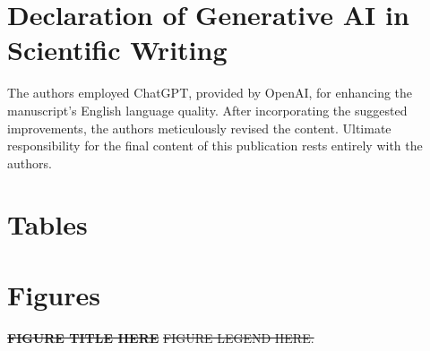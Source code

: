 \documentclass[preprint,review,12pt]{elsarticle}%
\providecommand{\DIFdeltex}[1]{{\protect\color{red}\sout{#1}}}                      %
\providecommand{\DIFdelbegin}{} %
\providecommand{\DIFdelFL}[1]{\DIFdel{#1}} %
\providecommand{\DIFdel}[1]{\texorpdfstring{\DIFdeltex{#1}}{}} %
\newcommand{\DIFscaledelfig}{0.5}
\newlength{\DIFdelgraphicswidth} %
\newlength{\DIFdelgraphicsheight} %
\newcommand{\DIFdelincludegraphics}[2][]{%
\sbox{\DIFdelgraphicsbox}{\DIFOincludegraphics[#1]{#2}}%
\settoboxwidth{\DIFdelgraphicswidth}{\DIFdelgraphicsbox} %
\settoboxtotalheight{\DIFdelgraphicsheight}{\DIFdelgraphicsbox} %
\scalebox{\DIFscaledelfig}{%
\parbox[b]{\DIFdelgraphicswidth}{\usebox{\DIFdelgraphicsbox}\\[-\baselineskip] \rule{\DIFdelgraphicswidth}{0em}}\llap{\resizebox{\DIFdelgraphicswidth}{\DIFdelgraphicsheight}{%
\setlength{\unitlength}{\DIFdelgraphicswidth}%
\begin{picture}(1,1)%
\thicklines\linethickness{2pt} %
{\color[rgb]{1,0,0}\put(0,0){\framebox(1,1){}}}%
{\color[rgb]{1,0,0}\put(0,0){\line( 1,1){1}}}%
{\color[rgb]{1,0,0}\put(0,1){\line(1,-1){1}}}%
\end{picture}%
}\hspace*{3pt}}} %
} %
\DeclareRobustCommand{\DIFdelbegin}{\DIFOdelbegin \let\includegraphics\DIFdelincludegraphics} %
\begin{document}
\begin{frontmatter}
\section*{Declaration of Generative AI in Scientific Writing}
The authors employed ChatGPT, provided by OpenAI, for enhancing the manuscript's English language quality. After incorporating the suggested improvements, the authors meticulously revised the content. Ultimate responsibility for the final content of this publication rests entirely with the authors.
\label{declaration of generative ai in scientific writing}


\clearpage
\section*{Tables}
\label{tables}


\clearpage
\section*{Figures}
\label{figures}

\DIFdelbegin %

{%
\textbf{\DIFdelFL{FIGURE TITLE HERE
}}
\DIFdelFL{FIGURE LEGEND HERE.
}}


\end{frontmatter}
\end{document}
